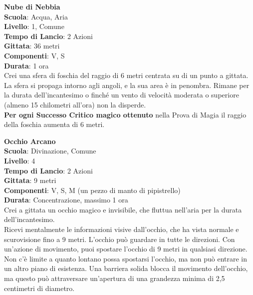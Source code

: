 \begin{multicols}{2}
\medskip\textbf{Nube di Nebbia}\\
\textbf{Scuola}: Acqua, Aria\\
\textbf{Livello}: 1, Comune\\
\textbf{Tempo di Lancio}: 2 Azioni\\
\textbf{Gittata}: 36 metri\\
\textbf{Componenti}: V, S\\
\textbf{Durata}: 1 ora\\
Crei una sfera di foschia del raggio di 6 metri centrata su di un punto a gittata. La sfera si propaga intorno agli angoli, e la sua area è in penombra. Rimane per la durata dell'incantesimo o finché un vento di velocità moderata o superiore (almeno 15 chilometri all'ora) non la disperde.\\
\textbf{Per ogni Successo Critico magico ottenuto} nella Prova di Magia il raggio della foschia aumenta di 6 metri.

\medskip\textbf{Occhio Arcano}\\
\textbf{Scuola}: Divinazione, Comune\\
\textbf{Livello}: 4\\
\textbf{Tempo di Lancio}: 2 Azioni\\
\textbf{Gittata}: 9 metri\\
\textbf{Componenti}: V, S, M (un pezzo di manto di pipistrello)\\
\textbf{Durata}: Concentrazione, massimo 1 ora\\
Crei a gittata un occhio magico e invisibile, che fluttua nell'aria per la durata dell'incantesimo.\\
Ricevi mentalmente le informazioni visive dall'occhio, che ha vista normale e scurovisione fino a 9 metri. L'occhio può guardare in tutte le direzioni. Con un'azione di movimento, puoi spostare l'occhio di 9 metri in qualsiasi direzione. Non c'è limite a quanto lontano possa spostarsi l'occhio, ma non può entrare in un altro piano di esistenza. Una barriera solida blocca il movimento dell'occhio, ma questo può attraversare un'apertura di una grandezza minima di 2,5 centimetri di diametro.


\end{multicols}
